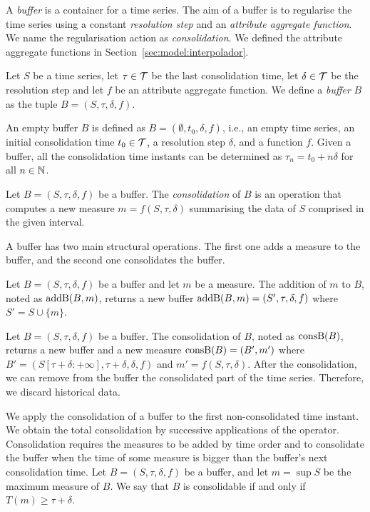 A \emph{buffer} is a container for a time series. The aim of a buffer
is to regularise the time series using a constant \emph{resolution
  step} and an \emph{attribute aggregate function}.  We name the
regularisation action as \emph{consolidation}. We defined the
attribute aggregate functions in Section~\ref{sec:model:interpolador}.

\begin{definition}[Buffer]
  Let $S$ be a time series, let $\tau\in\cal{T}$ be the last
  consolidation time, let $\delta\in\cal{T}$ be the resolution step
  and let $f$ be an attribute aggregate function. We define a
  \emph{buffer} $B$ as the tuple $B=(S,\tau,\delta,f)$.
\end{definition}

An empty buffer $B$ is defined as $B=(\emptyset, t_0, \delta, f)$,
i.e., an empty time series, an initial consolidation time
$t_0\in\cal{T}$, a resolution step $\delta$, and a function $f$.
Given a buffer, all the consolidation time instants can be determined
as $\tau_n=t_0+n\delta$ for all $n\in\mathbb{N}$.

Let $B=(S, \tau, \delta, f)$ be a buffer. The \emph{consolidation} of
$B$ is an operation that computes a new measure $m=f(S, \tau, \delta)$
summarising the data of $S$ comprised in the given interval.

A buffer has two main structural operations. The first one adds a
measure to the buffer, and the second one consolidates the buffer.

Let $B=(S,\tau,\delta,f)$ be a buffer and let $m$ be a measure.  The
addition of $m$ to $B$, noted as $\operatorname{addB}(B,m)$, returns a new buffer
$\operatorname{addB}(B,m)=(S',\tau,\delta,f)$ where $S' = S \cup \{m\}$.

Let $B=(S,\tau,\delta,f)$ be a buffer. The consolidation of $B$, noted
as $\operatorname{consB}(B)$, returns a new buffer and a new measure $\operatorname{consB}(B)=
(B',m')$ where $B'= (S[\tau+\delta:+\infty], \tau+\delta,\delta,f)$
and $m' = f(S,\tau,\delta)$. After the consolidation, we can remove
from the buffer the consolidated part of the time series. Therefore,
we discard historical data.

We apply the consolidation of a buffer to the first non-consolidated
time instant. We obtain the total consolidation by successive
applications of the operator. Consolidation requires the measures to
be added by time order and to consolidate the buffer when the time of
some measure is bigger than the buffer's next consolidation time.  Let
$B=(S,\tau,\delta,f)$ be a buffer, and let $m=\sup S$ be the maximum
measure of $B$. We say that $B$ is consolidable if and only if $T(m)
\geq \tau+\delta$.

